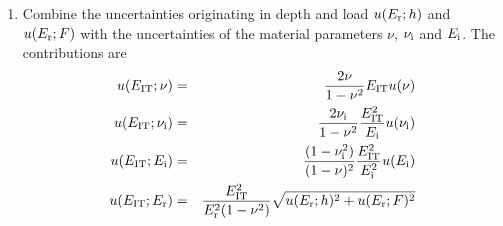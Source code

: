 \begin{enumerate}
\item \label{opodr_unc_Eit}
 Combine the uncertainties originating in depth and load $u(E_\mathrm{r};h)$ and $u(E_\mathrm{r};F)$ with the uncertainties of the material parameters $\nu$, $\nu_\mathrm{i}$ and $E_\mathrm{i}$.
  The contributions are
  \begin{eqnarray}
   u(E_\mathrm{IT};\nu)  &=& \frac{2\nu}{1-\nu^2} E_\mathrm{IT} u(\nu) \\ 
   u(E_\mathrm{IT};\nu_\mathrm{i}) &=& \frac{2\nu_\mathrm{i}}{1-\nu^2} \frac{E_\mathrm{IT}^2}{E_\mathrm{i}} u(\nu_\mathrm{i}) \\
   u(E_\mathrm{IT};E_\mathrm{i}) &=& \frac{(1-\nu_\mathrm{i}^2)}{(1-\nu)^2} \frac{E_\mathrm{IT}^2}{E_\mathrm{i}^2} u(E_\mathrm{i}) \\
   u(E_\mathrm{IT};E_\mathrm{r}) &=& \frac{E_\mathrm{IT}^2}{E_\mathrm{r}^2 (1-\nu^2)} \sqrt{ u(E_\mathrm{r};h)^2 + u(E_\mathrm{r};F)^2}
  \end{eqnarray}


\end{enumerate}
